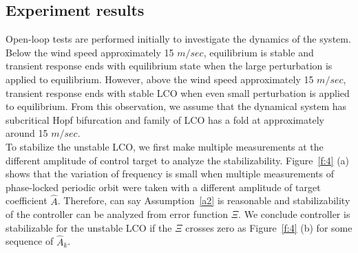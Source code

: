 \documentclass[openacc]{rsproca_new}%
\newcommand{\Fref}[1]{Figure~\ref{#1}}
\newcommand{\asref}[1]{Assumption~\ref{#1}}
\begin{document}
\subsection{Experiment results}\label{results}

Open-loop tests are performed initially to investigate the dynamics of the system. Below the wind speed approximately 15 $m/sec$, equilibrium is stable and transient response ends with equilibrium state when the large perturbation is applied to equilibrium. However, above the wind speed approximately 15 $m/sec$, transient response ends with stable LCO when even small perturbation is applied to equilibrium. From this observation, we assume that the dynamical system has subcritical Hopf bifurcation and family of LCO has a fold at approximately around 15 $m/sec$.\\
To stabilize the unstable LCO, we first make multiple measurements at the different amplitude of control target to analyze the stabilizability. \Fref{f:4} (a) shows that the variation of frequency is small when multiple measurements of phase-locked periodic orbit were taken with a different amplitude of target coefficient $\hat A$. Therefore, can say \asref{a2} is reasonable and stabilizability of the controller can be analyzed from error function $\Xi$. We conclude controller is stabilizable for the unstable LCO if the $\Xi$ crosses zero as \Fref{f:4} (b) for some sequence of $\hat A_k$.
\end{document}
